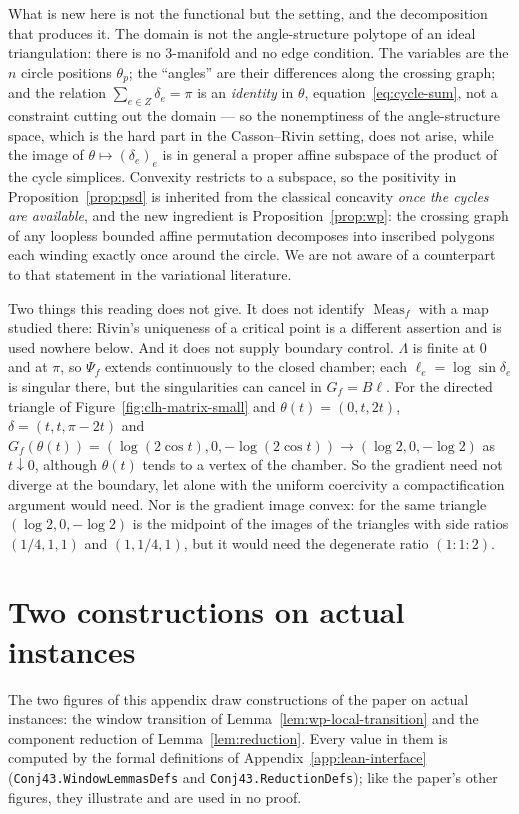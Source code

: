 \documentclass[11pt]{article}
\theoremstyle{definition}
\DeclareMathOperator{\Meas}{Meas}
\begin{document}
What is new here is not the functional but the setting, and the decomposition that produces it. The
domain is not the angle-structure polytope of an ideal triangulation: there is no $3$-manifold and no
edge condition. The variables are the $n$ circle positions $\theta_p$; the ``angles'' are their
differences along the crossing graph; and the relation $\sum_{e\in Z}\delta_e=\pi$ is an \emph{identity}
in $\theta$, equation~\eqref{eq:cycle-sum}, not a constraint cutting out the domain --- so the
nonemptiness of the angle-structure space, which is the hard part in the Casson--Rivin setting, does not
arise, while the image of $\theta\mapsto(\delta_e)_e$ is in general a proper affine subspace of the
product of the cycle simplices. Convexity restricts to a subspace, so the positivity in
Proposition~\ref{prop:psd} is inherited from the classical concavity \emph{once the cycles are
available}, and the new ingredient is Proposition~\ref{prop:wp}: the crossing graph of any
loopless bounded affine permutation decomposes into inscribed polygons each winding exactly once around
the circle. We are not aware of a counterpart to that statement in the variational literature.

Two things this reading does not give. It does not identify $\Meas_f$ with a map studied there: Rivin's
uniqueness of a critical point is a different assertion and is used nowhere below. And it does not
supply boundary control. $\Lambda$ is finite at $0$ and at $\pi$, so $\Psi_f$ extends continuously to
the closed chamber; each $\ell_e=\log\sin\delta_e$ is singular there, but the singularities can cancel in
$G_f=B\ell$. For the directed triangle of Figure~\ref{fig:clh-matrix-small} and $\theta(t)=(0,t,2t)$,
$\delta=(t,t,\pi-2t)$ and $G_f(\theta(t))=(\log(2\cos t),0,-\log(2\cos t))\to(\log2,0,-\log2)$ as
$t\downarrow0$, although $\theta(t)$ tends to a vertex of the chamber. So the gradient need not diverge at
the boundary, let alone with the uniform coercivity a compactification argument would need. Nor is the
gradient image convex: for the same triangle $(\log2,0,-\log2)$ is the midpoint of the images of the
triangles with side ratios $(1/4,1,1)$ and $(1,1/4,1)$, but it would need the degenerate ratio $(1:1:2)$.

\section{Two constructions on actual instances}\label{app:lean-regimes}
The two figures of this appendix draw constructions of the paper on actual instances: the window transition of
Lemma~\ref{lem:wp-local-transition} and the component reduction of Lemma~\ref{lem:reduction}. Every value in them is
computed by the formal definitions of Appendix~\ref{app:lean-interface} (\texttt{Conj43.\allowbreak WindowLemmasDefs} and
\texttt{Conj43.\allowbreak ReductionDefs}); like the paper's other figures, they illustrate and are used in no proof.
\end{document}
